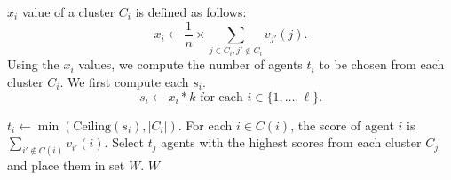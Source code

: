\documentclass[letterpaper]{article}
\begin{document}
\begin{algorithm}[ht!]
\begin{algorithmic}[1]
		 \STATE $x_i$ value of a cluster $C_i$ is defined as follows:
			 \[x_i\longleftarrow \frac{1}{n} \times \sum_{j\in C_i, j'\notin C_i}v_{j'}(j).\] 
			 \STATE Using the $x_i$ values, we compute the number of agents $t_i$ to be chosen from each cluster $C_i$. We first compute each $s_i$.
 \[s_i\longleftarrow x_i * k \text{ for each } i\in \{1,\ldots, \ell\}.\] 
	
			
			 			 \STATE $t_i \longleftarrow \min(\text{Ceiling}{(s_i)}, |C_i|)$.
			 			 \ENDFOR
				\STATE For each $i\in C(i)$, the score of agent $i$ is 
				 $\sum_{i'\notin C(i)}v_{i'}(i).$
				 \STATE Select $t_j$ agents with the highest scores from each cluster $C_j$ and place them in set $W$.
			\RETURN $W$		
		 \end{algorithmic}
		\end{algorithm}
\end{document}
